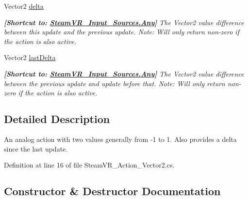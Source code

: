 \begin{DoxyCompactItemize}
Vector2 \mbox{\hyperlink{class_valve_1_1_v_r_1_1_steam_v_r___action___vector2_ad1de90619e8911feb3ad60732edefd51}{delta}}
\begin{DoxyCompactList}\small\item\em {\bfseries{\mbox{[}Shortcut to\+: \mbox{\hyperlink{namespace_valve_1_1_v_r_a82e5bf501cc3aa155444ee3f0662853faed36a1ef76a59ee3f15180e0441188ad}{Steam\+V\+R\+\_\+\+Input\+\_\+\+Sources.\+Any}}\mbox{]}}} The Vector2 value difference between this update and the previous update. Note\+: Will only return non-\/zero if the action is also active. \end{DoxyCompactList}\item 
Vector2 \mbox{\hyperlink{class_valve_1_1_v_r_1_1_steam_v_r___action___vector2_a64aa5d73aa92d61abf982584d29a7175}{last\+Delta}}
\begin{DoxyCompactList}\small\item\em {\bfseries{\mbox{[}Shortcut to\+: \mbox{\hyperlink{namespace_valve_1_1_v_r_a82e5bf501cc3aa155444ee3f0662853faed36a1ef76a59ee3f15180e0441188ad}{Steam\+V\+R\+\_\+\+Input\+\_\+\+Sources.\+Any}}\mbox{]}}} The Vector2 value difference between the previous update and update before that. Note\+: Will only return non-\/zero if the action is also active. \end{DoxyCompactList}\end{DoxyCompactItemize}


\subsection{Detailed Description}
An analog action with two values generally from -\/1 to 1. Also provides a delta since the last update. 



Definition at line 16 of file Steam\+V\+R\+\_\+\+Action\+\_\+\+Vector2.\+cs.



\subsection{Constructor \& Destructor Documentation}
\mbox{\label{class_valve_1_1_v_r_1_1_steam_v_r___action___vector2_acc03022252e10caa2e44c5a2e4ee180d}} 
